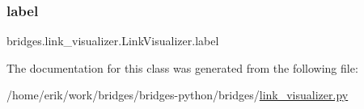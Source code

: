 \subsubsection{\texorpdfstring{label}{label}}
{\footnotesize\ttfamily bridges.\+link\+\_\+visualizer.\+Link\+Visualizer.\+label}



The documentation for this class was generated from the following file\+:\begin{DoxyCompactItemize}
\item 
/home/erik/work/bridges/bridges-\/python/bridges/\hyperlink{link__visualizer_8py}{link\+\_\+visualizer.\+py}\end{DoxyCompactItemize}
